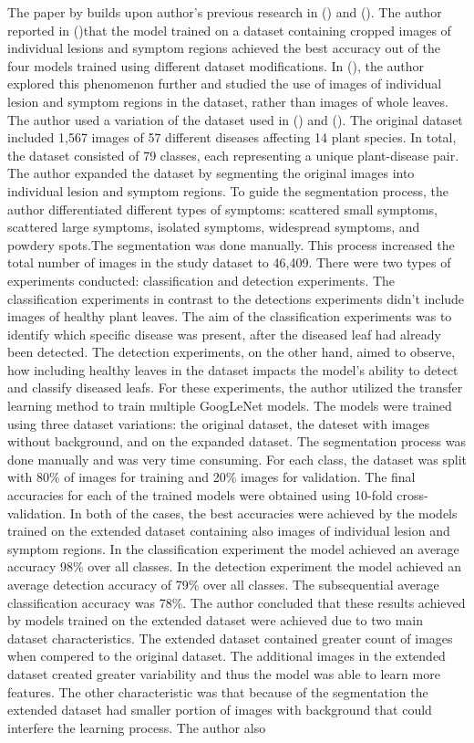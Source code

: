 \documentclass{BachelorBUI}
\begin{document}
The paper by \textcite{Barbedo:2019} builds upon author's previous research in (\cite{Barbedo:2018:1}) and (\cite{Barbedo:2018:2}). The author reported in (\cite{Barbedo:2018:2})that the model trained on a dataset containing cropped images of individual lesions and symptom regions achieved the best accuracy out of the four models trained using different dataset modifications. In (\cite{Barbedo:2019}), the author explored this phenomenon further and studied the use of images of individual lesion and symptom regions in the dataset, rather than images of whole leaves. The author used a variation of the dataset used in (\cite{Barbedo:2018:1}) and (\cite{Barbedo:2018:2}). The original dataset included 1,567 images of 57 different diseases affecting 14 plant species. In total, the dataset consisted of 79 classes, each representing a unique plant-disease pair. The author expanded the dataset by segmenting the original images into individual lesion and symptom regions. To guide the segmentation process, the author differentiated different types of symptoms: scattered small symptoms, scattered large symptoms, isolated symptoms, widespread symptoms, and powdery spots.The segmentation was done manually. This process increased the total number of images in the study dataset to 46,409. There were two types of experiments conducted: classification and detection experiments. The classification experiments in contrast to the detections experiments didn't include images of healthy plant leaves. The aim of the classification experiments was to identify which specific disease was present, after the diseased leaf had already been detected. The detection experiments, on the other hand, aimed to observe, how including healthy leaves in the dataset impacts the model's ability to detect and classify diseased leafs. For these experiments, the author utilized the transfer learning method to train multiple GoogLeNet models. The models were trained using three dataset variations: the original dataset, the dateset with images without background, and on the expanded dataset. The segmentation process was done manually and was very time consuming. For each class, the dataset was split with 80\% of images for training and 20\% images for validation. The final accuracies for each of the trained models were obtained using 10-fold cross-validation. In both of the cases, the best accuracies were achieved by the models trained on the extended dataset containing also images of individual lesion and symptom regions. In the classification experiment the model achieved an average accuracy 98\% over all classes. In the detection experiment the model achieved an average detection accuracy of 79\% over all classes. The subsequential average classification accuracy was 78\%. The author concluded that these results achieved by models trained on the extended dataset were achieved due to two main dataset characteristics. The extended dataset contained greater count of images when compered to the original dataset. The additional images in the extended dataset created greater variability and thus the model was able to learn more features. The other characteristic was that because of the segmentation the extended dataset had smaller portion of images with background that could interfere the learning process. The author also 
\end{document}
